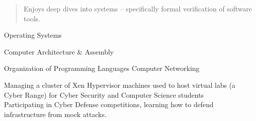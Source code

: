   \begin{quote}
    Enjoys deep dives into systems -- specifically formal verification of software tools.
  \end{quote}


  \smallskip{}

  \smallskip{}
  
  Operating Systems \par
  Computer Architecture \& Assembly \par
  Organization of Programming Languages
  Computer Networking
  

  Managing a cluster of Xen Hypervisor machines used to host virtual labs (a Cyber Range) for Cyber Security and Computer Science students
  \\
  Participating in Cyber Defense competitions, learning how to defend infrastructure from mock attacks.

